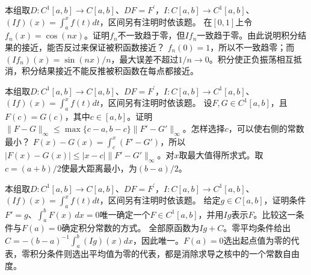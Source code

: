 本组取\(D:C^1[a,b]\to C[a,b]\)、\(DF=F^{\prime}\)，\(I:C[a,b]\to C^1[a,b]\)、\((If)(x)=\int_a^xf(t)dt\)，区间另有注明时依该题。
在\([0,1]\)上令\(f_n(x)=\cos(nx)\)。证明\(f_n\)不一致趋于零，但\(If_n\)一致趋于零。由此说明积分结果的接近，能否反过来保证被积函数接近？
\solutionanswer
\(f_n(0)=1\)，所以不一致趋零；而\((If_n)(x)=\sin(nx)/n\)，最大误差不超过\(1/n\to0\)。积分使正负振荡相互抵消，积分结果接近不能反推被积函数在每点都接近。


本组取\(D:C^1[a,b]\to C[a,b]\)、\(DF=F^{\prime}\)，\(I:C[a,b]\to C^1[a,b]\)、\((If)(x)=\int_a^xf(t)dt\)，区间另有注明时依该题。
设\(F,G\in C^1[a,b]\)，且\(F(c)=G(c)\)，其中\(c\in[a,b]\)。证明\(\|F-G\|_\infty\le\max\{c-a,b-c\}\|F'-G'\|_\infty\)。怎样选择\(c\)，可以使右侧的常数最小？
\solutionanswer
\(F(x)-G(x)=\int_c^x(F'-G')\)，所以\(|F(x)-G(x)|\le|x-c|\|F'-G'\|_\infty\)。对\(x\)取最大值得所求式。取\(c=(a+b)/2\)使最大距离最小，为\((b-a)/2\)。


本组取\(D:C^1[a,b]\to C[a,b]\)、\(DF=F^{\prime}\)，\(I:C[a,b]\to C^1[a,b]\)、\((If)(x)=\int_a^xf(t)dt\)，区间另有注明时依该题。
给定\(g\in C[a,b]\)，证明条件\(F'=g\)、\(\int_a^bF(x)\,dx=0\)唯一确定一个\(F\in C^1[a,b]\)，并用\(Ig\)表示\(F\)。比较这一条件与\(F(a)=0\)确定积分常数的方式。
\solutionanswer
全部原函数为\(Ig+C\)。零平均条件给出\(C=-(b-a)^{-1}\int_a^b(Ig)(x)dx\)，因此唯一。\(F(a)=0\)选出起点值为零的代表，零积分条件则选出平均值为零的代表，都是消除求导之核中的一个常数自由度。
\par
